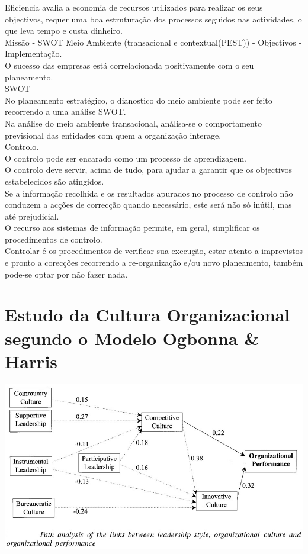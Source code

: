 Eficiencia avalia a economia de recursos utilizados para realizar os seus objectivos, requer uma boa estruturação dos processos seguidos nas actividades, o que leva tempo e custa dinheiro.\\

Missão - SWOT Meio Ambiente (transacional e contextual(PEST)) - Objectivos - Implementação.\\

O sucesso das empresas está correlacionada positivamente com o seu planeamento.\\

SWOT\\

No planeamento estratégico, o dianostico do meio ambiente pode ser feito recorrendo a uma análise SWOT.\\

Na análise do meio ambiente transacional, análisa-se o comportamento previsional das entidades com quem a organização interage.\\

Controlo.\\
O controlo pode ser encarado como um processo de aprendizagem.\\
O controlo deve servir, acima de tudo, para ajudar a garantir que os objectivos estabelecidos são atingidos.\\
Se a informação recolhida e os resultados apurados no processo de controlo não conduzem a acções de correcção quando necessário, este será não só inútil, mas até prejudicial.\\
O recurso aos sistemas de informação permite, em geral, simplificar os procedimentos de controlo.\\

Controlar é os procedimentos de verificar sua execução, estar atento a imprevistos e pronto a corecções recorrendo a re-organização e/ou novo planeamento, também pode-se optar por não fazer nada.\\




\section{Estudo da Cultura Organizacional segundo o Modelo Ogbonna \& Harris}




\includegraphics[scale=.45]{./image/OB/CORGA_1.jpg}

